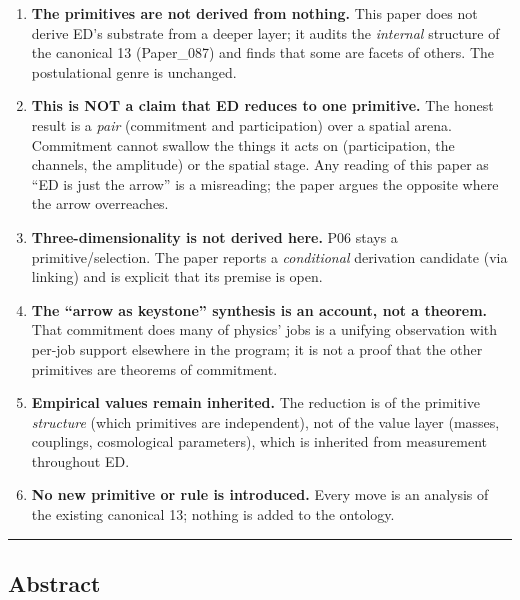 \documentclass[
  11pt,
]{article}
\providecommand{\tightlist}{%
  \setlength{\itemsep}{0pt}\setlength{\parskip}{0pt}}
\begin{document}
\begin{enumerate}
\def\labelenumi{\arabic{enumi}.}
\tightlist
\item
  \textbf{The primitives are not derived from nothing.} This paper does
  not derive ED's substrate from a deeper layer; it audits the
  \emph{internal} structure of the canonical 13 (Paper\_087) and finds
  that some are facets of others. The postulational genre is unchanged.
\item
  \textbf{This is NOT a claim that ED reduces to one primitive.} The
  honest result is a \emph{pair} (commitment and participation) over a
  spatial arena. Commitment cannot swallow the things it acts on
  (participation, the channels, the amplitude) or the spatial stage. Any
  reading of this paper as ``ED is just the arrow'' is a misreading; the
  paper argues the opposite where the arrow overreaches.
\item
  \textbf{Three-dimensionality is not derived here.} P06 stays a
  primitive/selection. The paper reports a \emph{conditional} derivation
  candidate (via linking) and is explicit that its premise is open.
\item
  \textbf{The ``arrow as keystone'' synthesis is an account, not a
  theorem.} That commitment does many of physics' jobs is a unifying
  observation with per-job support elsewhere in the program; it is not a
  proof that the other primitives are theorems of commitment.
\item
  \textbf{Empirical values remain inherited.} The reduction is of the
  primitive \emph{structure} (which primitives are independent), not of
  the value layer (masses, couplings, cosmological parameters), which is
  inherited from measurement throughout ED.
\item
  \textbf{No new primitive or rule is introduced.} Every move is an
  analysis of the existing canonical 13; nothing is added to the
  ontology.
\end{enumerate}

\begin{center}\rule{0.5\linewidth}{0.5pt}\end{center}

\subsection{Abstract}\label{abstract}
\end{document}
